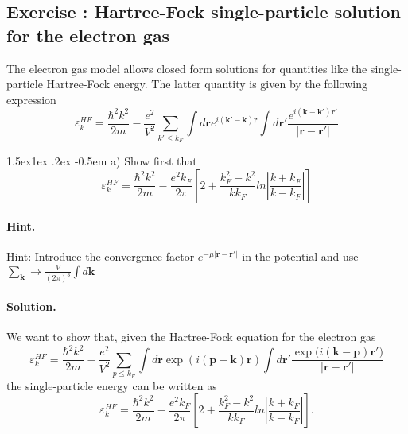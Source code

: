 \documentclass[%
twoside,                 %
final,                   %
10pt]{article}
\makeatletter
\newenvironment{doconceexercise}{}{}
\newcounter{doconceexercisecounter}
\newcommand\subex{\@startsection{paragraph}{4}{\z@}%
                  {1.5ex\@plus1ex \@minus.2ex}%
                  {-0.5em}%
                  {\normalfont\normalsize\bfseries}}
\makeatother
\begin{document}
\begin{doconceexercise}

\subsection*{Exercise \thedoconceexercisecounter: Hartree-Fock single-particle solution for the electron gas}


The electron gas model allows closed form solutions for quantities like the 
single-particle Hartree-Fock energy.  The latter quantity is given by the following expression
\[
\varepsilon_{k}^{HF}=\frac{\hbar^{2}k^{2}}{2m}-\frac{e^{2}}
{V^{2}}\sum_{k'\leq
k_{F}}\int d\mathbf{r}e^{i(\mathbf{k'}-\mathbf{k})\mathbf{r}}\int
d\mathbf{r}'\frac{e^{i(\mathbf{k}-\mathbf{k'})\mathbf{r}'}}
{\vert\mathbf{r}-\mathbf{r'}\vert}
\]


\subex{a)}
Show first that
\[
\varepsilon_{k}^{HF}=\frac{\hbar^{2}k^{2}}{2m}-\frac{e^{2}
k_{F}}{2\pi}
\left[
2+\frac{k_{F}^{2}-k^{2}}{kk_{F}}ln\left\vert\frac{k+k_{F}}
{k-k_{F}}\right\vert
\right]
\]


\paragraph{Hint.}
Hint: Introduce the convergence factor 
$e^{-\mu\vert\mathbf{r}-\mathbf{r}'\vert}$
in the potential and use  $\sum_{\mathbf{k}}\rightarrow
\frac{V}{(2\pi)^{3}}\int d\mathbf{k}$



\paragraph{Solution.}
We want to show that, given the Hartree-Fock equation for the electron gas
\[
\varepsilon_{k}^{HF}=\frac{\hbar^{2}k^{2}}{2m}-\frac{e^{2}}
{V^{2}}\sum_{p\leq
k_{F}}\int d\mathbf{r}\exp{(i(\mathbf{p}-\mathbf{k})\mathbf{r})}\int
d\mathbf{r}'\frac{\exp{(i(\mathbf{k}-\mathbf{p})\mathbf{r}'})}
{\vert\mathbf{r}-\mathbf{r'}\vert}
\]
the single-particle energy can be written as
\[
\varepsilon_{k}^{HF}=\frac{\hbar^{2}k^{2}}{2m}-\frac{e^{2}
k_{F}}{2\pi}
\left[
2+\frac{k_{F}^{2}-k^{2}}{kk_{F}}ln\left\vert\frac{k+k_{F}}
{k-k_{F}}\right\vert
\right].
\]


\end{doconceexercise}
\end{document}
